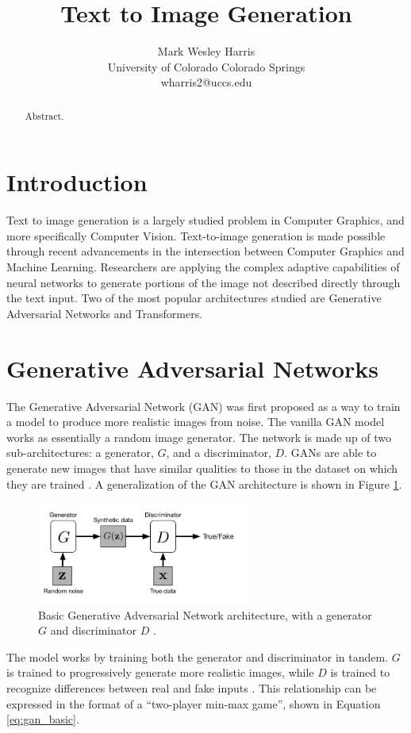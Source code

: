 \documentclass[letterpaper]{article} %
\title{Text to Image Generation}
\author{Mark Wesley Harris\\
University of Colorado Colorado Springs\\
wharris2@uccs.edu
}
\begin{document}
\maketitle

\begin{abstract}
Abstract.
\end{abstract}

\section{Introduction}
\label{sec:introduction}
Text to image generation is a largely studied problem in Computer Graphics, and 
more specifically Computer Vision.
Text-to-image generation is made possible through recent advancements in the 
intersection between Computer Graphics and Machine Learning. Researchers are 
applying the complex adaptive capabilities of neural networks to generate 
portions of the image not described directly through the text input.
Two of the most popular architectures studied are Generative Adversarial 
Networks and Transformers.

\section{Generative Adversarial Networks}
The Generative Adversarial Network (GAN)
was first proposed as a way to train a model to produce more realistic images
from noise. The vanilla GAN model works as essentially a random image generator.
The network is made up of two sub-architectures:
a generator, $G$, and a discriminator, $D$.
GANs are able to generate new images that have similar qualities to
those in the dataset on which they are trained
\cite{gans}.
A generalization of the GAN architecture is shown in Figure \ref{fig:gan}.

\begin{figure}[htbp]
	\centerline{\includegraphics[width=7cm]{gan.png}}
	\caption{Basic Generative Adversarial Network architecture, with a generator $G$
		and discriminator $D$
		\cite{cgan}.}
	\label{fig:gan}
\end{figure}

The model works by training both the generator and
discriminator in tandem.
$G$ is trained to progressively generate more realistic images,
while $D$ is trained to recognize differences between real and fake inputs \cite{cgan}.
This relationship can be expressed in the format of a
``two-player min-max game'', shown in Equation \ref{eq:gan_basic}.
\end{document}
